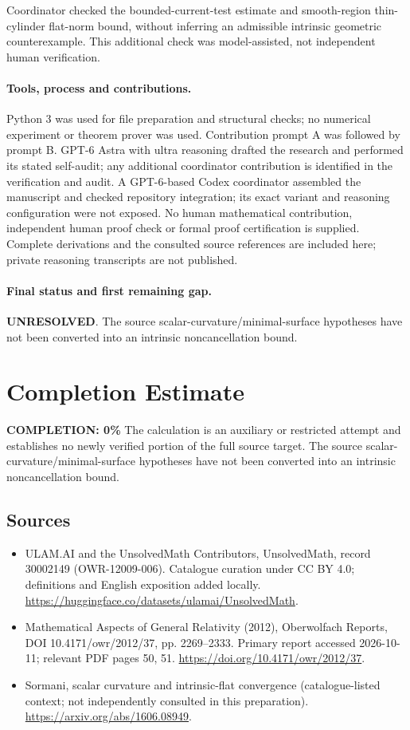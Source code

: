 \documentclass[11pt]{article}
\begin{document}
Coordinator checked the bounded-current-test estimate and smooth-region thin-cylinder flat-norm bound, without inferring an admissible intrinsic geometric counterexample. This additional check was model-assisted, not independent human verification.

\paragraph{Tools, process and contributions.}
Python 3 was used for file preparation and structural checks; no numerical experiment or theorem prover was used. Contribution prompt A was followed by prompt B. GPT-6 Astra with ultra reasoning drafted the research and performed its stated self-audit; any additional coordinator contribution is identified in the verification and audit. A GPT-6-based Codex coordinator assembled the manuscript and checked repository integration; its exact variant and reasoning configuration were not exposed. No human mathematical contribution, independent human proof check or formal proof certification is supplied. Complete derivations and the consulted source references are included here; private reasoning transcripts are not published.

\paragraph{Final status and first remaining gap.}
\textbf{UNRESOLVED}. The source scalar-curvature/minimal-surface hypotheses have not been converted into an intrinsic noncancellation bound.

\section{Completion Estimate}
\noindent\textbf{COMPLETION: 0\%}
The calculation is an auxiliary or restricted attempt and establishes no newly verified portion of the full source target. The source scalar-curvature/minimal-surface hypotheses have not been converted into an intrinsic noncancellation bound.

\subsection{Sources}
\begin{itemize}
\item[\hypertarget{source:30002149:1}{S1}] ULAM.AI and the UnsolvedMath Contributors, UnsolvedMath, record 30002149 (OWR-12009-006). Catalogue curation under CC BY 4.0; definitions and English exposition added locally.
\url{https://huggingface.co/datasets/ulamai/UnsolvedMath}.
\item[\hypertarget{source:30002149:2}{S2}] Mathematical Aspects of General Relativity (2012), Oberwolfach Reports, DOI 10.4171/owr/2012/37, pp. 2269--2333. Primary report accessed 2026-10-11; relevant PDF pages 50, 51.
\url{https://doi.org/10.4171/owr/2012/37}.
\item[\hypertarget{source:30002149:3}{S3}] Sormani, scalar curvature and intrinsic-flat convergence (catalogue-listed context; not independently consulted in this preparation).
\url{https://arxiv.org/abs/1606.08949}.
\end{itemize}
\label{end:30002149}
\end{document}
